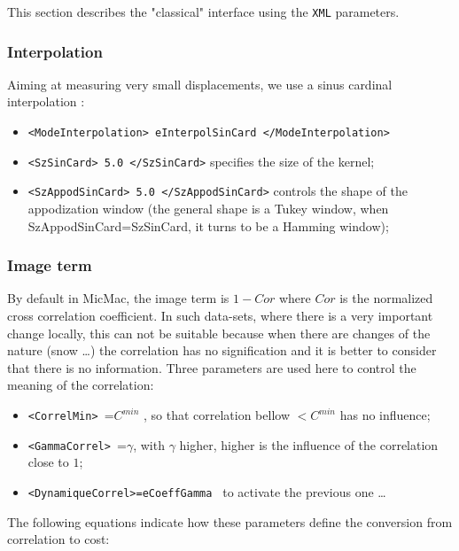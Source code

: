 This section describes the "classical" interface using the {\tt XML} parameters.

\subsubsection{Interpolation}

Aiming at measuring very small displacements, we use a sinus cardinal interpolation :

\begin{itemize}
   \item {\tt <ModeInterpolation> eInterpolSinCard </ModeInterpolation>}

   \item  {\tt <SzSinCard>  5.0 </SzSinCard>} specifies the size of the kernel;

   \item  {\tt  <SzAppodSinCard>  5.0 </SzAppodSinCard>} controls the shape of the appodization
          window (the general shape is a Tukey window, when SzAppodSinCard=SzSinCard, it turns to be
          a Hamming window);
\end{itemize}


\subsubsection{Image term}

By default in MicMac, the image term is $1-Cor$ where $Cor$ is the normalized cross correlation
coefficient. In such data-sets, where there is a very important change locally, this can not be
suitable because when there are changes of the nature (snow \dots)  the correlation has no
signification and it is better to consider that there is no information. %
Three parameters are used here to control the meaning of the correlation:


\begin{itemize}
   \item {\tt  <CorrelMin> }=$C^{min}$ ,
         so  that correlation bellow $<C^{min}$ has no influence;
   \item {\tt  <GammaCorrel> }=$\gamma$, with $\gamma$ higher, higher is the influence of the correlation
         close to $1$;
   \item {\tt  <DynamiqueCorrel>=eCoeffGamma } to activate the previous one \dots
\end{itemize}

The following equations indicate how these parameters define the conversion from correlation to cost:

